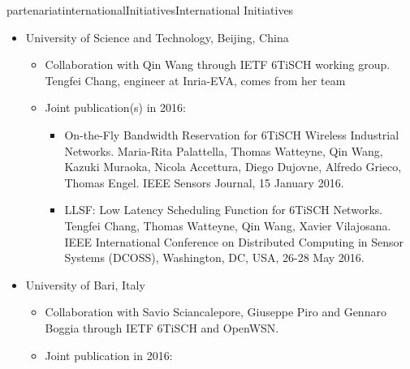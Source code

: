 \documentclass{ra2016}
\begin{document}
\begin{module}{partenariat}{internationalInitiatives}{International Initiatives}
\begin{itemize}
\begin{itemize}
\begin{itemize}
                    \item OpenWSN \& OpenMote: Demo'ing A Complete Ecosystem for the Industrial Internet of Things. Tengfei Chang, Pere Tuset-Peiro, Jonathan Munoz, Xavier Vilajosana, Thomas Watteyne. IEEE International Conference on Sensing, Communication and Networking (SECON), poster and demo session, London, UK, 27-30 June 2016.
                    \item OpenMote+: a Range-Agile Multi-Radio Mote. Pere Tuset, Xavier Vilajosana, Thomas Watteyne. International Conference on Embedded Wireless Systems and Networks (EWSN), NexMote Workshop, ACM, Graz, Austria, 14-15 February 2016.
                    \item Numerous IETF Internet-Drafts.
                \end{itemize}
        \end{itemize}
    \item University of Science and Technology, Beijing, China
        \begin{itemize}
            \item Collaboration with Qin Wang through IETF 6TiSCH working group.
                Tengfei Chang, engineer at Inria-EVA, comes from her team
            \item Joint publication(s) in 2016:
                \begin{itemize}
                    \item On-the-Fly Bandwidth Reservation for 6TiSCH Wireless Industrial Networks. Maria-Rita Palattella, Thomas Watteyne, Qin Wang, Kazuki Muraoka, Nicola Accettura, Diego Dujovne, Alfredo Grieco, Thomas Engel. IEEE Sensors Journal, 15 January 2016.
                    \item LLSF: Low Latency Scheduling Function for 6TiSCH Networks. Tengfei Chang, Thomas Watteyne, Qin Wang, Xavier Vilajosana. IEEE International Conference on Distributed Computing in Sensor Systems (DCOSS), Washington, DC, USA, 26-28 May 2016.
                \end{itemize}
        \end{itemize}
    \item University of Bari, Italy
        \begin{itemize}
            \item Collaboration with Savio Sciancalepore, Giuseppe Piro and Gennaro Boggia through IETF 6TiSCH and OpenWSN.
            \item Joint publication in 2016:
                \begin{itemize}

\end{itemize}
\end{itemize}
\end{itemize}
\end{module}
\end{document}
